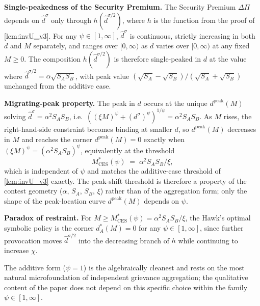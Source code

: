 \documentclass[11pt,twoside]{extarticle}
\begin{document}
\medskip\noindent\textbf{Single-peakedness of the Security Premium.} The Security Premium $\Delta\Pi$ depends on $\hat d^\sigma$ only through $h(\hat d^{\sigma/2})$, where $h$ is the function from the proof of \autoref{lem:invU_v3}. For any $\psi\in[1,\infty]$, $\hat d^\sigma$ is continuous, strictly increasing in both $d$ and $M$ separately, and ranges over $[0,\infty)$ as $d$ varies over $[0,\infty)$ at any fixed $M\ge 0$. The composition $h(\hat d^{\sigma/2})$ is therefore single-peaked in $d$ at the value where $\hat d^{\sigma/2}=\alpha\sqrt{S_A S_B}$, with peak value $(\sqrt{S_A}-\sqrt{S_B})/(\sqrt{S_A}+\sqrt{S_B})$ unchanged from the additive case.

\medskip\noindent\textbf{Migrating-peak property.} The peak in $d$ occurs at the unique $d^{\mathrm{peak}}(M)$ solving $\hat d^\sigma=\alpha^2 S_A S_B$, i.e.\ $((\xi M)^\psi+(d^\sigma)^\psi)^{1/\psi}=\alpha^2 S_A S_B$. As $M$ rises, the right-hand-side constraint becomes binding at smaller $d$, so $d^{\mathrm{peak}}(M)$ decreases in $M$ and reaches the corner $d^{\mathrm{peak}}(M)=0$ exactly when $(\xi M)^\psi=(\alpha^2 S_A S_B)^\psi$, equivalently at the threshold
\begin{equation}\label{eq:CES_threshold}
    M^*_{\mathrm{CES}}(\psi)\;=\;\alpha^2 S_A S_B/\xi,
\end{equation}
which is independent of $\psi$ and matches the additive-case threshold of \autoref{lem:invU_v3} exactly. The peak-shift threshold is therefore a property of the contest geometry ($\alpha$, $S_A$, $S_B$, $\xi$) rather than of the aggregation form; only the shape of the peak-location curve $d^{\mathrm{peak}}(M)$ depends on $\psi$.

\medskip\noindent\textbf{Paradox of restraint.} For $M\ge M^*_{\mathrm{CES}}(\psi)=\alpha^2 S_A S_B/\xi$, the Hawk's optimal symbolic policy is the corner $d_A^*(M)=0$ for any $\psi\in[1,\infty]$, since further provocation moves $\hat d^{\sigma/2}$ into the decreasing branch of $h$ while continuing to increase $\chi$.

The additive form ($\psi=1$) is the algebraically cleanest and rests on the most natural microfoundation of independent grievance aggregation; the qualitative content of the paper does not depend on this specific choice within the family $\psi\in[1,\infty]$.
\end{document}
